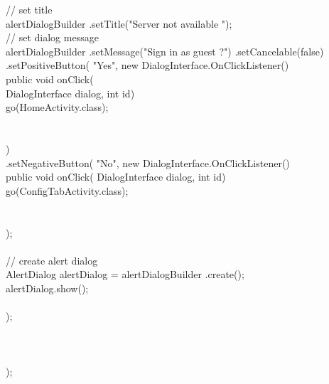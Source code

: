 \documentclass[12pt,a4paper]{article}
\begin{document}
{{{{{{{								// set title\\
								alertDialogBuilder
										.setTitle("Server not available ");\\

								// set dialog message\\
								alertDialogBuilder
										.setMessage("Sign in as guest ?")
										.setCancelable(false)
										.setPositiveButton(
												"Yes",
												new DialogInterface.OnClickListener() {\\
													public void onClick(\\
															DialogInterface dialog,
															int id) {\\
														go(HomeActivity.class);\\
\\
													}\\
												})\\
										.setNegativeButton(
												"No",
												new DialogInterface.OnClickListener() {\\
													public void onClick(
															DialogInterface dialog,
															int id) {\\
														go(ConfigTabActivity.class);\\
\\
													}\\
												});\\
\\
								// create alert dialog\\
								AlertDialog alertDialog = alertDialogBuilder
										.create();\\
								alertDialog.show();\\

							}\\
						});\\
					}\\
				}\\
			}\\
		});\\
	}\\
	
\newpage
\\
\end{document}

